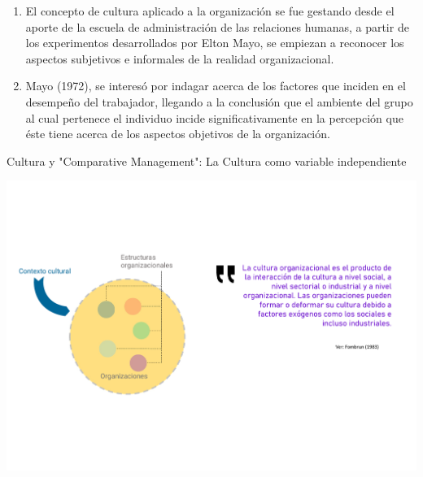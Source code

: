 \documentclass[aspectratio=169]{beamer}
\begin{document}
	\begin{frame}
		\begin{enumerate}
			\item El concepto de cultura aplicado a la organización se fue gestando desde el aporte de la escuela de administración de las relaciones humanas, a partir de los experimentos desarrollados por Elton Mayo, se empiezan a reconocer los aspectos subjetivos e informales de la realidad organizacional. 
			
			\item Mayo (1972), se interesó por indagar acerca de los factores que inciden en el desempeño del trabajador, llegando a la conclusión que el ambiente del grupo al cual pertenece el individuo incide significativamente en la percepción que éste tiene acerca de los aspectos objetivos de la organización. 
		\end{enumerate}
	\end{frame}
	\begin{frame}{Cultura y "Comparative Management": La Cultura como variable independiente}
		\begin{center}
			\includegraphics[height=\textheight]{./figures/L5.pdf}
		\end{center}
	\end{frame}
\end{document}
